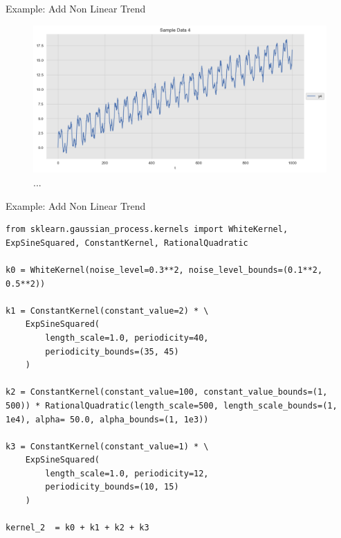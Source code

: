 \documentclass[10pt]{beamer}
\begin{document}
\begin{frame}{Example: Add Non Linear Trend}
\begin{center}
\begin{figure}
\includegraphics[scale=0.4]{images/gaussian_process_time_series_files/gaussian_process_time_series_76_0.png} 
\caption{ ...  }
\end{figure}
\end{center}
\end{frame}

\begin{frame}[fragile]{Example: Add Non Linear Trend}
\begin{lstlisting}
from sklearn.gaussian_process.kernels import WhiteKernel, ExpSineSquared, ConstantKernel, RationalQuadratic

k0 = WhiteKernel(noise_level=0.3**2, noise_level_bounds=(0.1**2, 0.5**2))

k1 = ConstantKernel(constant_value=2) * \ 
    ExpSineSquared(
        length_scale=1.0, periodicity=40, 
        periodicity_bounds=(35, 45)
    )

k2 = ConstantKernel(constant_value=100, constant_value_bounds=(1, 500)) * RationalQuadratic(length_scale=500, length_scale_bounds=(1, 1e4), alpha= 50.0, alpha_bounds=(1, 1e3))

k3 = ConstantKernel(constant_value=1) * \ 
    ExpSineSquared(
        length_scale=1.0, periodicity=12, 
        periodicity_bounds=(10, 15)
    )

kernel_2  = k0 + k1 + k2 + k3
\end{lstlisting}
\end{frame}
\end{document}
